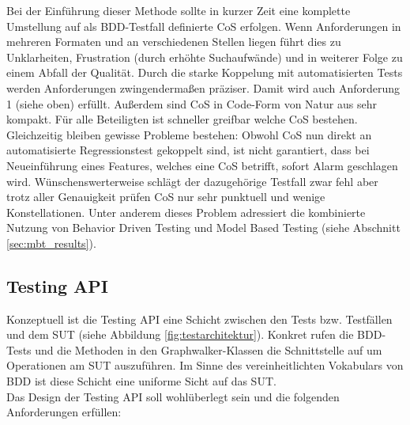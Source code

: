 Bei der Einführung dieser Methode sollte in kurzer Zeit eine komplette Umstellung auf als BDD-Testfall definierte CoS erfolgen. Wenn Anforderungen in mehreren Formaten und an verschiedenen Stellen liegen führt dies zu Unklarheiten, Frustration (durch erhöhte Suchaufwände) und in weiterer Folge zu einem Abfall der Qualität. Durch die starke Koppelung mit automatisierten Tests werden Anforderungen zwingendermaßen präziser. Damit wird auch Anforderung 1 (siehe oben) erfüllt. Außerdem sind CoS in Code-Form von Natur aus sehr kompakt. Für alle Beteiligten ist schneller greifbar welche CoS bestehen.\\
Gleichzeitig bleiben gewisse Probleme bestehen: Obwohl CoS nun direkt an automatisierte Regressionstest gekoppelt sind, ist nicht garantiert, dass bei Neueinführung eines Features, welches eine CoS betrifft, sofort Alarm geschlagen wird. Wünschenswerterweise schlägt der dazugehörige Testfall zwar fehl aber trotz aller Genauigkeit prüfen CoS nur sehr punktuell und wenige Konstellationen. Unter anderem dieses Problem adressiert die kombinierte Nutzung von Behavior Driven Testing und Model Based Testing (siehe Abschnitt \ref{sec:mbt_results}).

\subsection{Testing API}
\label{sec:testing_api}
Konzeptuell ist die Testing API eine Schicht zwischen den Tests bzw. Testfällen und dem \Gls{SUT} (siehe Abbildung \ref{fig:testarchitektur}). Konkret rufen die BDD-Tests und die Methoden in den Graphwalker-Klassen die Schnittstelle auf um Operationen am \Gls{SUT} auszuführen. Im Sinne des vereinheitlichten Vokabulars von BDD ist diese Schicht eine uniforme Sicht auf das SUT.\\
Das Design der Testing API soll wohlüberlegt sein und die folgenden Anforderungen erfüllen:

